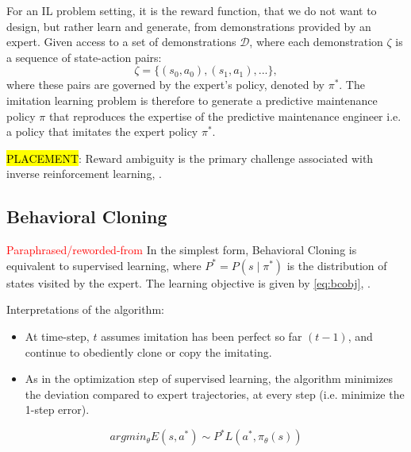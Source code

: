\documentclass{article}
\newcommand{\hlc}[2][blue!10]{{\colorlet{foo}{#1} \sethlcolor{foo}\hl{#2}}}
\begin{document}
	For an IL problem setting, it is the reward function, that we do not want to design, but rather learn and generate, from demonstrations provided by an expert. Given access to a set of demonstrations $\mathcal{D}$, where each demonstration $\zeta$ is a sequence of state-action pairs:
	\begin{equation}\label{eq:demo}
		\zeta = \{(s_0, a_0), (s_1, a_1), ...\},
	\end{equation}
	where these pairs are governed by the expert's policy, denoted by $\pi^{*}$. 	
	The imitation learning problem is therefore to generate a predictive maintenance policy $\pi$ that reproduces the expertise of the predictive maintenance engineer i.e. a policy that imitates the expert policy $\pi^{*}$.
	
	\hlc{PLACEMENT}: Reward ambiguity is the primary challenge associated with inverse reinforcement learning, \citep{ng2000algorithms, stanford-lectures, baheri2023}.
	
	
	\subsection{Behavioral Cloning} 
	\textcolor{red}{Paraphrased/reworded-from \cite{yue2018imitation}}
	In the simplest form, Behavioral Cloning is equivalent to supervised learning, where $P^* = P(s\mid\pi^*)$ is the distribution of states visited by the expert. The learning objective is given by \eqref{eq:bcobj}, \cite{yue2018imitation}. 
	
	Interpretations of the algorithm:
	\begin{itemize}
		\item At time-step, $t$ assumes imitation has been perfect so far $(t-1)$, and continue to obediently clone or copy the imitating.
		\item As in the optimization step of supervised learning, the algorithm minimizes the deviation compared to expert trajectories, at every step (i.e. minimize the 1-step error).
	\end{itemize}
	
	\begin{equation}\label{eq:bcobj}
		argmin_\theta E(s,a^*) \sim P^* L(a^*, \pi_{\theta}(s))	
	\end{equation}
	
\end{document}
